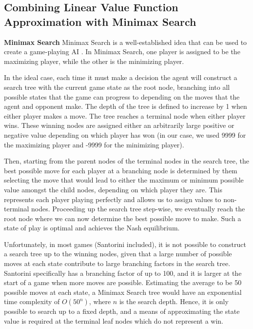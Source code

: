 \documentclass[a4paper,12pt,table]{article}
\begin{document}
\subsection{Combining Linear Value Function Approximation with Minimax Search}

\textbf{Minimax Search}
\newline
Minimax Search is a well-established idea that can be used to create a game-playing AI \cite{Artificial Intelligence: A Modern Approach}. In Minimax Search, one player is assigned to be the maximizing player, while the other is the minimizing player. \par

In the ideal case, each time it must make a decision the agent will construct a search tree with the current game state as the root node, branching into all possible states that the game can progress to depending on the moves that the agent and opponent make. The depth of the tree is defined to increase by 1 when either player makes a move. The tree reaches a terminal node when either player wins. These winning nodes are assigned either an arbitrarily large positive or negative value depending on which player has won (in our case, we used 9999 for the maximizing player and -9999 for the minimizing player). \par

Then, starting from the parent nodes of the terminal nodes in the search tree, the best possible move for each player at a branching node is determined by them selecting the move that would lead to either the maximum or minimum possible value amongst the child nodes, depending on which player they are. This represents each player playing perfectly and allows us to assign values to non-terminal nodes. Proceeding up the search tree step-wise, we eventually reach the root node where we can now determine the best possible move to make. Such a state of play is optimal and achieves the Nash equilibrium. \par

Unfortunately, in most games (Santorini included), it is not possible to construct a search tree up to the winning nodes, given that a large number of possible moves at each state contribute to large branching factors in the search tree. Santorini specifically has a branching factor of up to 100, and it is larger at the start of a game when more moves are possible. Estimating the average to be 50 possible moves at each state, a Minimax Search tree would have an exponential time complexity of $O(50^n)$, where $n$ is the search depth. Hence, it is only possible to search up to a fixed depth, and a means of approximating the state value is required at the terminal leaf nodes which do not represent a win. \par
\end{document}

